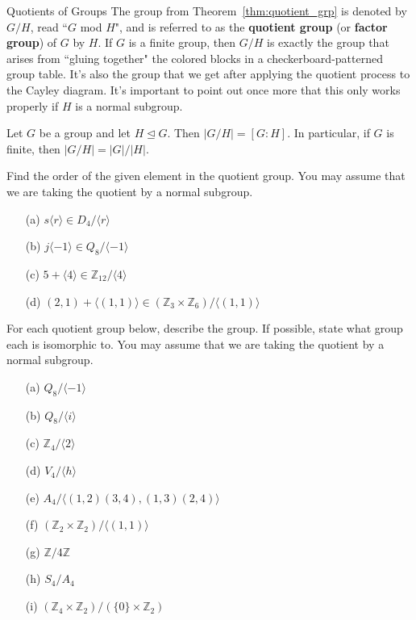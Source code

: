 \begin{section}{Quotients of Groups}
The group from Theorem~\ref{thm:quotient_grp} is denoted by $G/H$, read ``$G$ mod $H$", and is referred to as the \textbf{quotient group} (or \textbf{factor group}) of $G$ by $H$.  If $G$ is a finite group, then $G/H$ is exactly the group that arises from ``gluing together" the colored blocks in a checkerboard-patterned group table.  It's also the group that we get after applying the quotient process to the Cayley diagram.  It's important to point out once more that this only works properly if $H$ is a normal subgroup.

\begin{theorem}
Let $G$ be a group and let $H\trianglelefteq G$.  Then $|G/H|=[G:H]$.  In particular, if $G$ is finite, then $|G/H|=|G|/|H|$.
\end{theorem}

\begin{exercise}%
Find the order of the given element in the quotient group. You may assume that we are taking the quotient by a normal subgroup. 
\begin{enumerate}
\item[(a)] $s\langle r\rangle \in D_4/\langle r\rangle$
\item[(b)] $j\langle -1\rangle \in Q_8/\langle -1\rangle$
\item[(c)] $5+\langle 4\rangle \in \mathbb{Z}_{12}/\langle 4\rangle$
\item[(d)] $(2,1)+\langle (1,1)\rangle \in (\mathbb{Z}_3\times \mathbb{Z}_6)/\langle (1,1)\rangle$ 
\end{enumerate}
\end{exercise}

\begin{exercise}
For each quotient group below, describe the group.  If possible, state what group each is isomorphic to.  You may assume that we are taking the quotient by a normal subgroup. 
\begin{enumerate}
\item[(a)] $Q_8/\langle -1\rangle$
\item[(b)] $Q_8/\langle i\rangle$
\item[(c)] $\mathbb{Z}_4/\langle 2\rangle$
\item[(d)] $V_4/\langle h\rangle$
\item[(e)] $A_4/\langle (1,2)(3,4),(1,3)(2,4)\rangle$
\item[(f)] $(\mathbb{Z}_2\times \mathbb{Z}_2)/\langle (1,1)\rangle$
\item[(g)] $\mathbb{Z}/4\mathbb{Z}$
\item[(h)] $S_4/A_4$
\item[(i)] $(\mathbb{Z}_4\times \mathbb{Z}_2)/(\{0\}\times \mathbb{Z}_2)$
\end{enumerate}
\end{exercise}


\end{section}
